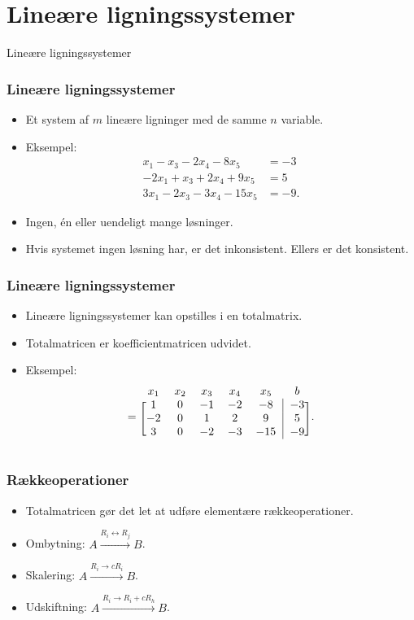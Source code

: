 \section{Lineære ligningssystemer}
\begin{frame}
\centering
\Huge
Lineære ligningssystemer
\end{frame}
%
\begin{frame}
\frametitle{Lineære ligningssystemer}
\begin{itemize}
\item Et system af $m$ lineære ligninger med de samme $n$ variable. 
\item Eksempel:
\begin{align*}
x_1-x_3-2x_4-8x_5&=-3 \\
-2x_1+x_3+2x_4+9x_5&=5 \\
3x_1-2x_3-3x_4-15x_5&=-9.
\end{align*}
\item Ingen, én eller uendeligt mange løsninger. 
\item Hvis systemet ingen løsning har, er det inkonsistent. Ellers er det konsistent. 
\end{itemize}
\end{frame}
\begin{frame}
\frametitle{Lineære ligningssystemer}
\begin{itemize}
\item Lineære ligningssystemer kan opstilles i en totalmatrix. 
\item Totalmatricen er koefficientmatricen udvidet. 
\item Eksempel:
\begin{equation*}
  [A \mid \mathbf{b}] =
\begin{blockarray}{ccccccc}
x_1 & x_2 & x_3 & x_4 & x_5 & b \\
\begin{block}{[ccccc|c]c}
  1 & 0 & -1 & -2 & -8 & -3 \\
  -2 & 0 & 1 & 2 & 9 & 5 \\
  3 & 0 & -2 & -3 & -15 & -9 \\
\end{block}
\end{blockarray}.
\end{equation*}
\end{itemize}
\end{frame}
\begin{frame}
\frametitle{Rækkeoperationer}
\begin{itemize}
\item Totalmatricen gør det let at udføre elementære rækkeoperationer. 
\item Ombytning: $A \xrightarrow{R_i \leftrightarrow R_j} B$. 
\item Skalering: $A \xrightarrow{R_i \rightarrow cR_i} B$.
\item Udskiftning: $A \xrightarrow{R_i \rightarrow R_i + cR_h} B$.
\end{itemize}
\end{frame}
